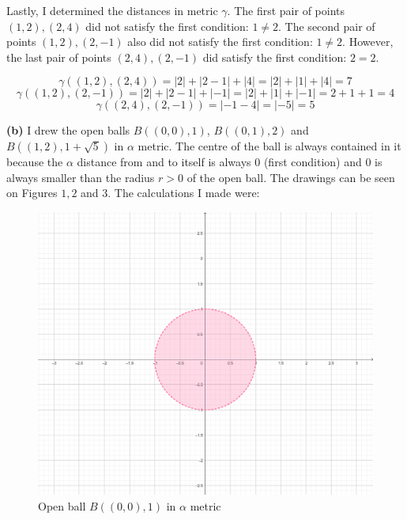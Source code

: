 \documentclass[12pt]{article}
\begin{document}
    \noindent Lastly, I determined the distances in metric $\gamma$. The first pair of points $(1,2), (2,4)$ did not satisfy the first condition: $1\neq2$. The second pair of points $(1,2), (2,-1)$ also did not satisfy the first condition: $1\neq2$. However, the last pair of points $(2,4),(2,-1)$ did satisfy the first condition: $2=2$. 
    
    $$\gamma((1,2), (2,4)) = |2| + |2-1| + |4| = |2| + |1| + |4| = 7 $$
    $$\gamma((1,2), (2,-1)) = |2| + |2-1| + |-1| = |2| + |1| + |-1| = 2 + 1 + 1 = 4  $$
    $$\gamma((2,4),(2,-1)) = |-1-4| = |-5| = 5$$
    
    \textbf{(b)} I drew the open balls $B((0,0), 1)$, $B((0,1), 2)$ and $B((1,2), 1 + \sqrt{5})$ in $\alpha$ metric. The centre of the ball is always contained in it because the $\alpha$ distance from and to itself is always $0$ (first condition) and $0$ is always smaller than the radius $r>0$ of the open ball. The drawings can be seen on Figures $1, 2$ and $3$. The calculations I made were: 
    
    \begin{figure}
    	\centering
    	\includegraphics[scale=0.20] {graph1}
    	\caption{\label{fig:1} Open ball $B((0,0), 1) $ in $\alpha$ metric }
    \end{figure}
    
\end{document}
